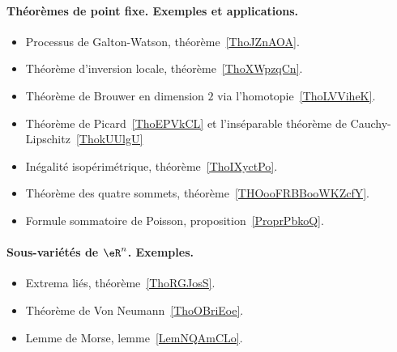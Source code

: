 \paragraph{Théorèmes de point fixe. Exemples et applications.}
\begin{itemize}
    \item Processus de Galton-Watson, théorème~\ref{ThoJZnAOA}.
    \item Théorème d'inversion locale, théorème~\ref{ThoXWpzqCn}.
    \item Théorème de Brouwer en dimension \( 2\) via l'homotopie~\ref{ThoLVViheK}.
    \item Théorème de Picard~\ref{ThoEPVkCL} et l'inséparable théorème de Cauchy-Lipschitz~\ref{ThokUUlgU}
\end{itemize}
\begin{itemize}
    \item Inégalité isopérimétrique, théorème~\ref{ThoIXyctPo}.
    \item Théorème des quatre sommets, théorème~\ref{THOooFRBBooWKZcfY}.
\end{itemize}
\begin{itemize}
    \item Formule sommatoire de Poisson, proposition~\ref{ProprPbkoQ}.
\end{itemize}
\paragraph{Sous-variétés de \( \eR^n\). Exemples.}
\begin{itemize}
    \item Extrema liés, théorème~\ref{ThoRGJosS}.
    \item Théorème de Von Neumann~\ref{ThoOBriEoe}.
    \item Lemme de Morse, lemme~\ref{LemNQAmCLo}.
\end{itemize}
